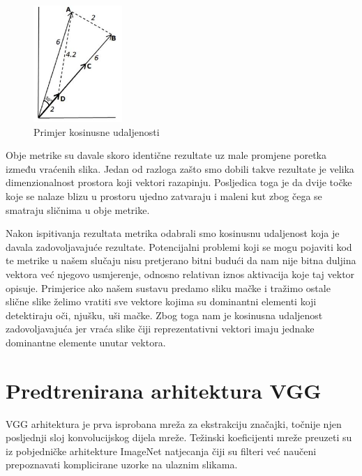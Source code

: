 \documentclass[times, utf8, proizvoljni, numeric]{fer}
\begin{document}
\begin{figure}[!ht]
	\begin{center}
		\captionsetup{justification=centering}
		\includegraphics[width=0.3\textwidth]{./imgs/kosinusna_udaljenost.png}
		\caption{Primjer kosinusne udaljenosti \cite{VectorSimilarity}}
		\label{fg:kosinusna_udaljenost}
	\end{center}
\end{figure}

Obje metrike su davale skoro identične rezultate uz male promjene poretka između vraćenih slika. Jedan od razloga zašto smo dobili takve rezultate je velika dimenzionalnost prostora koji vektori razapinju. Posljedica toga je da dvije točke koje se nalaze blizu u prostoru ujedno zatvaraju i maleni kut zbog čega se smatraju sličnima u obje metrike.	

Nakon ispitivanja rezultata metrika odabrali smo kosinusnu udaljenost koja je davala zadovoljavajuće rezultate. Potencijalni problemi koji se mogu pojaviti kod te metrike u našem slučaju nisu pretjerano bitni budući da nam nije bitna duljina vektora već njegovo usmjerenje, odnosno relativan iznos aktivacija koje taj vektor opisuje. Primjerice ako našem sustavu predamo sliku mačke i tražimo ostale slične slike želimo vratiti sve vektore kojima su dominantni elementi koji detektiraju oči, njušku, uši mačke. Zbog toga nam je kosinusna udaljenost zadovoljavajuća jer vraća slike čiji reprezentativni vektori imaju jednake dominantne elemente unutar vektora.


\section{Predtrenirana arhitektura VGG}

VGG arhitektura je prva isprobana mreža za ekstrakciju značajki, točnije njen posljednji sloj konvolucijskog dijela mreže. Težinski koeficijenti mreže preuzeti su iz pobjedničke arhitekture ImageNet natjecanja čiji su filteri već naučeni prepoznavati komplicirane uzorke na ulaznim slikama.
\end{document}
